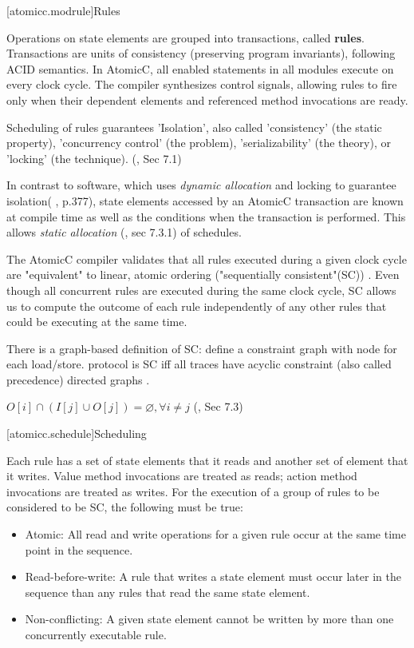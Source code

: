 [atomicc.modrule]{Rules}

Operations on state elements are grouped into transactions, called \textbf{rules}.
Transactions are units of consistency (preserving program invariants), following ACID semantics.
In AtomicC, all enabled statements in all modules execute on every clock cycle.
The compiler synthesizes control signals, allowing rules to fire
only when their dependent elements and referenced method invocations are ready.

Scheduling of rules guarantees 'Isolation',
also called 'consistency' (the static property), 'concurrency control'
(the problem), 'serializability' (the theory), or 'locking' (the technique). (\cite{GrayR93}, Sec 7.1)

In contrast to software, which uses \textit{dynamic allocation} and locking to guarantee isolation(
\cite{GrayR93}, p.377),
state elements accessed by an AtomicC transaction are known at compile time as well as the
conditions when the transaction is performed.  This allows \textit{static allocation}
(\cite{GrayR93}, sec 7.3.1) of schedules.

The AtomicC compiler
validates that all rules executed during a given clock cycle are "equivalent"
to linear, atomic ordering ("sequentially consistent"(SC))
\cite{Lamport:1979:MMC:1311099.1311750}.
Even though all concurrent rules are executed during the same clock cycle,
SC allows us to compute the
outcome of each rule independently of any other rules that could be executing at the same time.

There is a graph-based definition of SC: define a constraint graph with node for each load/store.
protocol is SC iff all traces have acyclic constraint (also called precedence) directed graphs
\cite{Cain2003}.

$O[i] \cap (I[j] \cup O[j]) = \varnothing, \forall i \neq j $
(\cite{GrayR93}, Sec 7.3)

[atomicc.schedule]{Scheduling}

Each rule has a set of state elements that it reads and another set of element that it writes.
Value method invocations are treated as reads; action method invocations are treated as writes.
For the execution of a group of rules to be considered to be SC, the following must
be true:
\begin{itemize}
\item Atomic: All read and write operations for a given rule occur at the same time point in the sequence.
\item Read-before-write:  A rule that writes a state element must occur later in the sequence
than any rules that read the same state element.
\item Non-conflicting: A given state element cannot be written by more than one concurrently executable rule.
\end{itemize}

